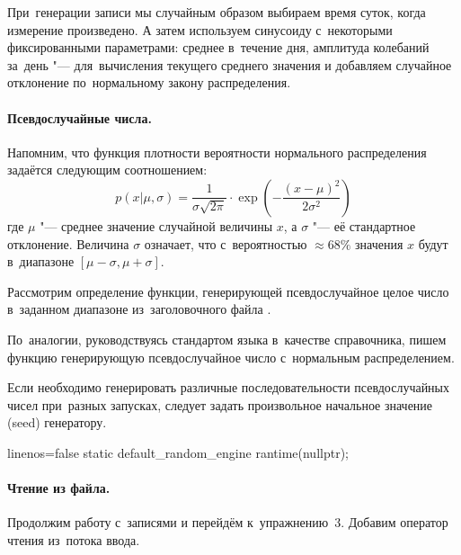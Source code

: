 
При~генерации записи мы случайным образом выбираем время суток, когда измерение произведено. А затем используем синусоиду с~некоторыми фиксированными параметрами: среднее в~течение дня, амплитуда колебаний за~день "--- для~вычисления текущего среднего значения и добавляем случайное отклонение по~нормальному закону распределения.



\paragraph{Псевдослучайные числа.}
Напомним, что функция плотности вероятности нормального распределения задаётся следующим соотношением:
\[
  p(x|\mu, \sigma) = \frac{1}{\sigma\sqrt{2\pi}} \cdot
                     \exp\left( -\frac{(x - \mu)^2}{2\sigma^2} \right)
\]
\noindent где \(\mu\) "--- среднее значение случайной величины \(x\), а \(\sigma\) "--- её стандартное отклонение. Величина \(\sigma\) означает, что с~вероятностью \(\approx 68\%\) значения \(x\) будут в~диапазоне \([\mu - \sigma, \mu + \sigma]\).

Рассмотрим определение функции, генерирующей псевдослучайное целое число в~заданном диапазоне из~заголовочного файла .


По~аналогии, руководствуясь стандартом языка в~качестве справочника, пишем функцию генерирующую псевдослучайное число с~нормальным распределением.


\noindent Если необходимо генерировать различные последовательности псевдослучайных чисел при~разных запусках, следует задать произвольное начальное значение (\textenglish{seed}) генератору.

\begin{cppcode*}{linenos=false}
  static default_random_engine ran{time(nullptr)};
\end{cppcode*}



\paragraph{Чтение из файла.}
Продолжим работу с~записями и перейдём к~упражнению~3. Добавим оператор чтения из~потока ввода.

